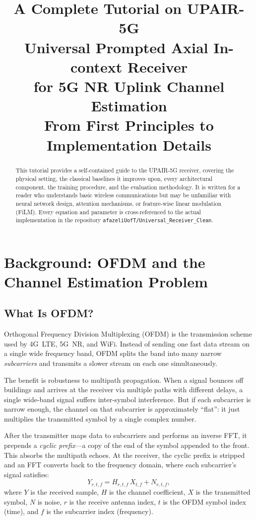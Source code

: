 \documentclass[11pt,a4paper]{article}
\title{\LARGE\bfseries A Complete Tutorial on UPAIR-5G\\[8pt]
	\large Universal Prompted Axial In-context Receiver\\
	for 5G NR Uplink Channel Estimation\\[12pt]
	\normalsize From First Principles to Implementation Details}
\author{}
\date{}
\begin{document}
	\maketitle
	\thispagestyle{empty}
	
	\begin{abstract}
		\noindent
		This tutorial provides a self-contained guide to the UPAIR-5G receiver, covering the physical setting, the classical baselines it improves upon, every architectural component, the training procedure, and the evaluation methodology.  It is written for a reader who understands basic wireless communications but may be unfamiliar with neural network design, attention mechanisms, or feature-wise linear modulation (FiLM).  Every equation and parameter is cross-referenced to the actual implementation in the repository \texttt{afazeliUofT/Universal\_Receiver\_Clean}.
	\end{abstract}
	
	\tableofcontents
	\newpage
	
	\section{Background: OFDM and the Channel Estimation Problem}
	
	\subsection{What Is OFDM?}
	
	Orthogonal Frequency Division Multiplexing (OFDM) is the transmission scheme used by 4G~LTE, 5G~NR, and WiFi.  Instead of sending one fast data stream on a single wide frequency band, OFDM splits the band into many narrow \emph{subcarriers} and transmits a slower stream on each one simultaneously.
	
	The benefit is robustness to multipath propagation.  When a signal bounces off buildings and arrives at the receiver via multiple paths with different delays, a single wide-band signal suffers inter-symbol interference.  But if each subcarrier is narrow enough, the channel on that subcarrier is approximately ``flat'': it just multiplies the transmitted symbol by a single complex number.
	
	After the transmitter maps data to subcarriers and performs an inverse FFT, it prepends a \emph{cyclic prefix}---a copy of the end of the symbol appended to the front.  This absorbs the multipath echoes.  At the receiver, the cyclic prefix is stripped and an FFT converts back to the frequency domain, where each subcarrier's signal satisfies:
	\begin{equation}
		Y_{r,t,f} = H_{r,t,f} \, X_{t,f} + N_{r,t,f},
		\label{eq:ofdm_basic}
	\end{equation}
	where $Y$ is the received sample, $H$ is the channel coefficient, $X$ is the transmitted symbol, $N$ is noise, $r$ is the receive antenna index, $t$ is the OFDM symbol index (time), and $f$ is the subcarrier index (frequency).
	
\end{document}
